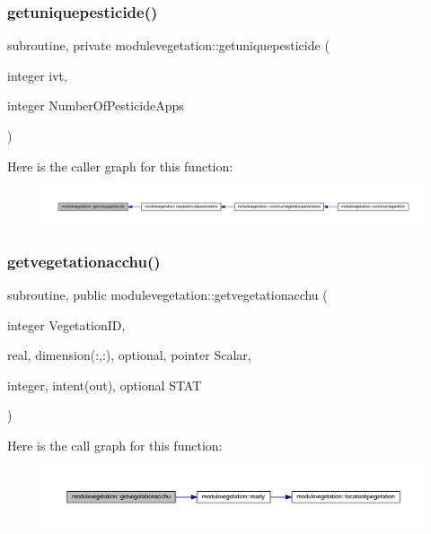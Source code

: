 \subsubsection{\texorpdfstring{getuniquepesticide()}{getuniquepesticide()}}
{\footnotesize\ttfamily subroutine, private modulevegetation\+::getuniquepesticide (\begin{DoxyParamCaption}\item[{integer}]{ivt,  }\item[{integer}]{Number\+Of\+Pesticide\+Apps }\end{DoxyParamCaption})\hspace{0.3cm}{\ttfamily [private]}}

Here is the caller graph for this function\+:\nopagebreak
\begin{figure}[H]
\begin{center}
\leavevmode
\includegraphics[width=350pt]{namespacemodulevegetation_a57f3018a613928cdd40f99577993f439_icgraph}
\end{center}
\end{figure}
\mbox{\label{namespacemodulevegetation_a9c5cba62246c38a0de1aebb1aaa788d6}} 
\subsubsection{\texorpdfstring{getvegetationacchu()}{getvegetationacchu()}}
{\footnotesize\ttfamily subroutine, public modulevegetation\+::getvegetationacchu (\begin{DoxyParamCaption}\item[{integer}]{Vegetation\+ID,  }\item[{real, dimension(\+:,\+:), optional, pointer}]{Scalar,  }\item[{integer, intent(out), optional}]{S\+T\+AT }\end{DoxyParamCaption})}

Here is the call graph for this function\+:\nopagebreak
\begin{figure}[H]
\begin{center}
\leavevmode
\includegraphics[width=350pt]{namespacemodulevegetation_a9c5cba62246c38a0de1aebb1aaa788d6_cgraph}
\end{center}
\end{figure}
\mbox{\label{namespacemodulevegetation_a2c86b41a4e32d9f80ab445ee7695a777}} 
